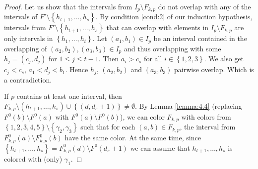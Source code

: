 \documentclass[12pt]{article}
\theoremstyle{definition}
\begin{document}
\begin{proof}
        Let us show that the 
        intervals from $I_{p}
        \setminus F_{k, p}$ do 
        not overlap with 
        any of the intervals of
        $F' \setminus \left\{
        h_{t+1},\ldots,h_{s}\right\}$.
        By condition \ref{cond:2}
        of our induction hypothesis, 
        intervals from
        $F' \setminus \left\{h_{t+1},
        \ldots, h_{s}\right\}$
        that can overlap with 
        elements in $I_{p} \setminus 
        F_{k,p}$ are only intervals
        in $\left\{h_1, \ldots, h_{t}\right\}$.
        Let $\left(a_1, b_1\right) \in I_{p}$ 
        be an interval contained in the
        overlapping of
        $\left(a_2, b_2\right), 
        \left(a_3, b_3\right)
        \in I_{p}$ and thus
        overlapping with some
        $h_{j} =\left(c_{j}, d_{j}\right)$ 
        for $1 \leq j \leq t-1$.
        Then $a_{i} > c_{s}$ for
        all $i \in \left\{1, 2, 3\right\}$.
        We also get $c_{j} < c_{s}$,
        $a_1 < d_{j} < b_1$. Hence
        $h_{j}$, $\left(a_2, b_2\right)$ 
        and $\left(a_3, b_3\right)$ 
        pairwise overlap.
        Which is a contradiction.

        If $p$ contains at least one interval,
        then $F_{k, p} \setminus \left(h_{t+1},
        \ldots, h_{s}\right) \cup 
        \left\{\left(d, d_{s} + 1\right)\right\}
        \neq \emptyset$.
        By Lemma \ref{lemma:4.4}
        (replacing $F^{0}\left(b\right)
        \setminus F^{0}\left(a\right)$
        with $F^{0}\left(a\right)
        \setminus F^{0}\left(b\right)$),
        we can color $F_{k, p}$ 
        with colors from
        $\left\{1,2,3,4,5\right\} \setminus 
        \left\{\gamma_2, \gamma_3\right\}$
        such that
        for each
        $\left(a, b\right) \in 
        F_{k, p}$,
        the interval from
        $F^{0}_{k, p}\left(a\right) \setminus 
        F^{0}_{k, p}\left(b\right)$
        have the same color.
        At the same time,
        since $\left\{h_{t+1},
        \ldots, h_{s}\right\}
        = F^{0}_{k, p}\left(d\right)
        \setminus F^{0}\left(d_{s} + 1\right)$
        we can assume that 
        $h_{t+1}, \ldots,
        h_{s}$ is colored 
        with (only) $\gamma_1$.
        

\end{proof}
\end{document}
